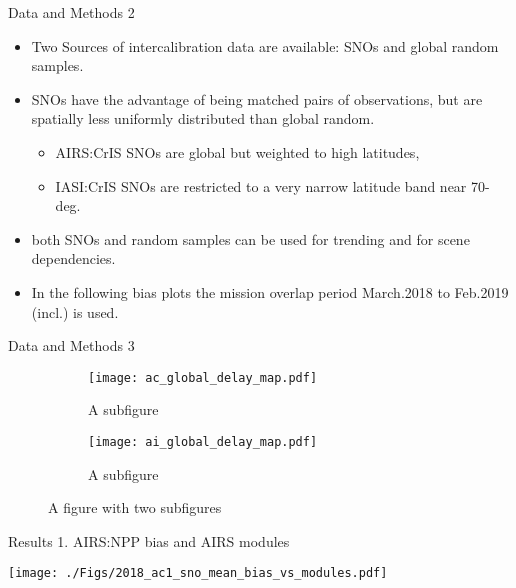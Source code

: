 \documentclass[10pt,t]{beamer}
\begin{document}
\begin{frame}{Data and Methods 2}

  \begin{itemize}
  \item Two Sources of intercalibration data are available: SNOs and global random samples.
  \item SNOs have the advantage of being matched pairs of observations, but are spatially less uniformly distributed than global random.
    \begin{itemize}
    \item AIRS:CrIS SNOs are global but weighted to high latitudes,
    \item IASI:CrIS SNOs are restricted to a very narrow latitude band near 70-deg.
    \end{itemize}
  \item both SNOs and random samples can be used for trending and for scene dependencies.
  \item In the following bias plots the mission overlap period March.2018 to Feb.2019 (incl.) is used.
    
  \end{itemize}

\end{frame}

\begin{frame}{Data and Methods 3}
  
\begin{figure}
\centering
\begin{subfigure}{.5\textwidth}
  \centering
  \texttt{[image: ac\_global\_delay\_map.pdf]}
  \caption{A subfigure}
  \label{fig:sub1}
\end{subfigure}%
\begin{subfigure}{.5\textwidth}
  \centering
  \texttt{[image: ai\_global\_delay\_map.pdf]}
  \caption{A subfigure}
  \label{fig:sub2}
\end{subfigure}
\caption{A figure with two subfigures}
\label{fig:test}
\end{figure}

\end{frame}

\begin{frame}{Results 1. AIRS:NPP bias and AIRS modules}

\vspace{-0.1in}
\begin{block}{}
  \begin{center}
    \texttt{[image: ./Figs/2018\_ac1\_sno\_mean\_bias\_vs\_modules.pdf]}
  \end{center}
\end{block}
    
\end{frame}
\end{document}
